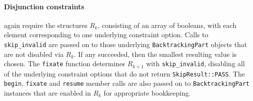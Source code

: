    \paragraph*{Disjunction constraints} again require the structures $R_k$,
    consisting of an array of booleans, with each element corresponding to one
    underlying constraint option.
    Calls to \texttt{skip\_invalid} are passed on to those underlying
    \texttt{BacktrackingPart} objects that are not disabled via $R_k$.
    If any succeeded, then the smallest resulting value is chosen.
    The {\tt fixate} function determines $R_{k+1}$ with \texttt{skip\_invalid},
    disabling all of the underlying constraint options that do not return
    {\tt SkipResult::PASS}.
    The \texttt{begin}, \texttt{fixate} and \texttt{resume} member calls are
    also passed on to {\tt BacktrackingPart} instances that are enabled in
    $R_k$ for appropriate bookkeeping.

